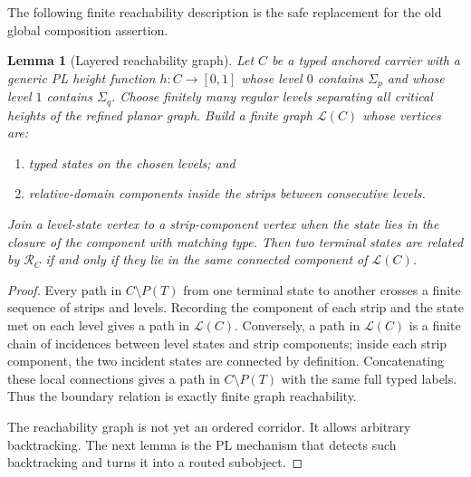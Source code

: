 \documentclass[11pt]{amsart}
\newtheorem{lemma}[theorem]{Lemma}
\theoremstyle{definition}
\begin{document}
The following finite reachability description is the safe replacement for the old global composition assertion.

\begin{lemma}[Layered reachability graph]
Let \(C\) be a typed anchored carrier with a generic PL height function \(h:C\to[0,1]\) whose level \(0\) contains \(\Sigma_p\) and whose level \(1\) contains \(\Sigma_q\). Choose finitely many regular levels separating all critical heights of the refined planar graph. Build a finite graph \(\mathcal L(C)\) whose vertices are:

\begin{enumerate}
\item typed states on the chosen levels; and
\item relative-domain components inside the strips between consecutive levels.
\end{enumerate}

Join a level-state vertex to a strip-component vertex when the state lies in the closure of the component with matching type. Then two terminal states are related by \(\mathcal R_C\) if and only if they lie in the same connected component of \(\mathcal L(C)\).

\end{lemma}
\begin{proof}
Every path in \(C\setminus P(T)\) from one terminal state to another crosses a finite sequence of strips and levels. Recording the component of each strip and the state met on each level gives a path in \(\mathcal L(C)\). Conversely, a path in \(\mathcal L(C)\) is a finite chain of incidences between level states and strip components; inside each strip component, the two incident states are connected by definition. Concatenating these local connections gives a path in \(C\setminus P(T)\) with the same full typed labels. Thus the boundary relation is exactly finite graph reachability.

The reachability graph is not yet an ordered corridor. It allows arbitrary backtracking. The next lemma is the PL mechanism that detects such backtracking and turns it into a routed subobject.

\end{proof}
\end{document}
